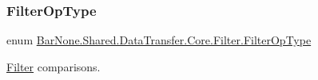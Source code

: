 \subsubsection{\texorpdfstring{Filter\+Op\+Type}{FilterOpType}}
{\footnotesize\ttfamily enum \mbox{\hyperlink{namespace_bar_none_1_1_shared_1_1_data_transfer_1_1_core_1_1_filter_a2a88b61b121c8cf76b6c2f4b97055daa}{Bar\+None.\+Shared.\+Data\+Transfer.\+Core.\+Filter.\+Filter\+Op\+Type}}\hspace{0.3cm}{\ttfamily [strong]}}



\mbox{\hyperlink{namespace_bar_none_1_1_shared_1_1_data_transfer_1_1_core_1_1_filter}{Filter}} comparisons. 

